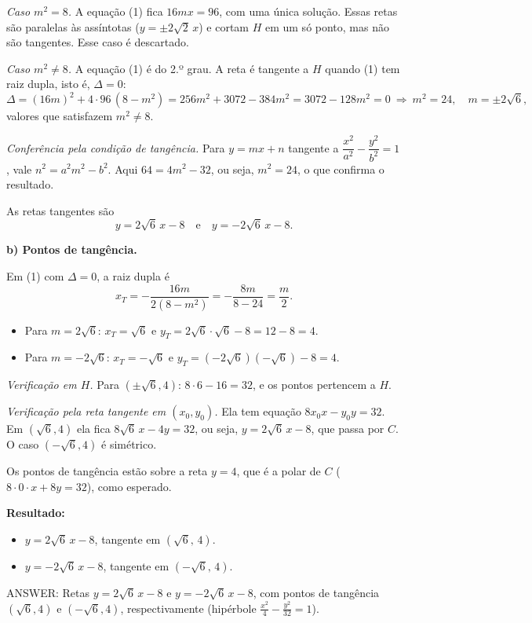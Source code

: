 \documentclass{article}%
\begin{document}
\emph{Caso $m^2=8$.} A equação (1) fica $16mx=96$, com uma única solução. Essas retas são paralelas às assíntotas ($y=\pm 2\sqrt2\,x$) e cortam $H$ em um só ponto, mas não são tangentes. Esse caso é descartado.

\emph{Caso $m^2\ne 8$.} A equação (1) é do 2.º grau. A reta é tangente a $H$ quando (1) tem raiz dupla, isto é, $\Delta=0$:
\[
\Delta=(16m)^2+4\cdot 96\,(8-m^2)=256m^2+3072-384m^2=3072-128m^2=0
\ \Longrightarrow\ m^2=24,\quad m=\pm 2\sqrt6 ,
\]
valores que satisfazem $m^2\neq 8$.

\emph{Conferência pela condição de tangência.} Para $y=mx+n$ tangente a $\dfrac{x^2}{a^2}-\dfrac{y^2}{b^2}=1$, vale $n^2=a^2m^2-b^2$. Aqui $64=4m^2-32$, ou seja, $m^2=24$, o que confirma o resultado.

As retas tangentes são
\[
\boxed{y=2\sqrt6\,x-8\quad\text{e}\quad y=-2\sqrt6\,x-8 .}
\]

\textbf{b) Pontos de tangência.}

Em (1) com $\Delta=0$, a raiz dupla é
\[
x_T=-\frac{16m}{2(8-m^2)}=-\frac{8m}{8-24}=\frac{m}{2}.
\]

\begin{itemize}
\item Para $m=2\sqrt6$: $x_T=\sqrt6$ e $y_T=2\sqrt6\cdot\sqrt6-8=12-8=4$.
\item Para $m=-2\sqrt6$: $x_T=-\sqrt6$ e $y_T=(-2\sqrt6)(-\sqrt6)-8=4$.
\end{itemize}

\emph{Verificação em $H$.} Para $(\pm\sqrt6,4)$: $8\cdot 6-16=32$, e os pontos pertencem a $H$.

\emph{Verificação pela reta tangente em $(x_0,y_0)$.} Ela tem equação $8x_0x-y_0y=32$. Em $(\sqrt6,4)$ ela fica $8\sqrt6\,x-4y=32$, ou seja, $y=2\sqrt6\,x-8$, que passa por $C$. O caso $(-\sqrt6,4)$ é simétrico.

Os pontos de tangência estão sobre a reta $y=4$, que é a polar de $C$ ($8\cdot 0\cdot x+8y=32$), como esperado.

\textbf{Resultado:}
\begin{itemize}
\item $y=2\sqrt6\,x-8$, tangente em $(\sqrt6,\,4)$.
\item $y=-2\sqrt6\,x-8$, tangente em $(-\sqrt6,\,4)$.
\end{itemize}

ANSWER: Retas $y=2\sqrt6\,x-8$ e $y=-2\sqrt6\,x-8$, com pontos de tangência $(\sqrt6,4)$ e $(-\sqrt6,4)$, respectivamente (hipérbole $\frac{x^2}{4}-\frac{y^2}{32}=1$).%
\newpage%
\end{document}
